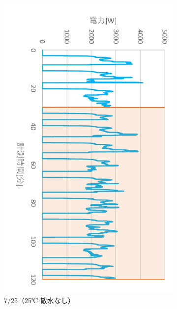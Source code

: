 \documentclass[a4j,fleqn,dvipdfmx,uplatex]{jsarticle}
\begin{document}
\begin{figure}[htb]
\begin{subfigure}[b]{0.4\hsize}
      \includegraphics[width=\linewidth]{img/t_p/20220725.png}
      \caption{7/25（25℃ 散水なし）}
  \end{subfigure}\\
  \begin{subfigure}[b]{0.4\hsize}
      \centering

\end{subfigure}
\end{figure}
\end{document}
